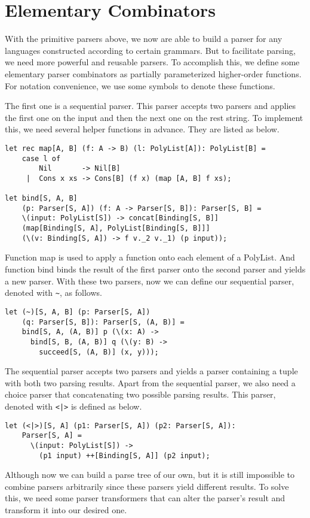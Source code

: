 \section{Elementary Combinators}
With the primitive parsers above, we now are able to build a parser for any languages constructed according to certain grammars. But to facilitate parsing, we need more powerful and reusable parsers. To accomplish this, we define some elementary parser combinators as partially parameterized higher-order functions. For notation convenience, we use some symbols to denote these functions.

The first one is a sequential parser. This parser accepts two parsers and applies the first one on the input and then the next one on the rest string. To implement this, we need several helper functions in advance. They are listed as below.
\begin{lstlisting}
let rec map[A, B] (f: A -> B) (l: PolyList[A]): PolyList[B] =
    case l of
        Nil       -> Nil[B]
     |  Cons x xs -> Cons[B] (f x) (map [A, B] f xs);
     
let bind[S, A, B] 
    (p: Parser[S, A]) (f: A -> Parser[S, B]): Parser[S, B] =
    \(input: PolyList[S]) -> concat[Binding[S, B]] 
    (map[Binding[S, A], PolyList[Binding[S, B]]] 
    (\(v: Binding[S, A]) -> f v._2 v._1) (p input));
\end{lstlisting}
Function map is used to apply a function onto each element of a PolyList. And function bind binds the result of the first parser onto the second parser and yields a new parser. With these two parsers, now we can define our sequential parser, denoted with \texttt{\textasciitilde}, as follows.
\begin{lstlisting}
let (~)[S, A, B] (p: Parser[S, A]) 
    (q: Parser[S, B]): Parser[S, (A, B)] =
	bind[S, A, (A, B)] p (\(x: A) -> 
	  bind[S, B, (A, B)] q (\(y: B) -> 
	    succeed[S, (A, B)] (x, y)));
\end{lstlisting}
The sequential parser accepts two parsers and yields a parser containing a tuple with both two parsing results. Apart from the sequential parser, we also need a choice parser that concatenating two possible parsing results. This parser, denoted with \texttt{<|>} is defined as below.
\begin{lstlisting}
let (<|>)[S, A] (p1: Parser[S, A]) (p2: Parser[S, A]): 
    Parser[S, A] =
	  \(input: PolyList[S]) -> 
	    (p1 input) ++[Binding[S, A]] (p2 input);
\end{lstlisting}
Although now we can build a parse tree of our own, but it is still impossible to combine parsers arbitrarily since these parsers yield different results. To solve this, we need some parser transformers that can alter the parser's result and transform it into our desired one.

